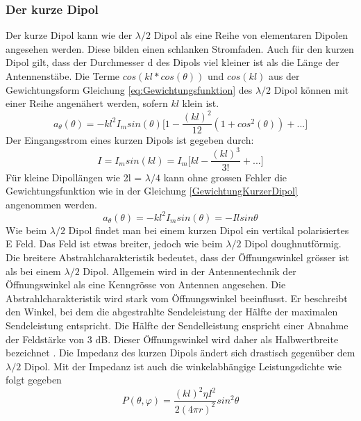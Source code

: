\newpage
\subsubsection{Der kurze Dipol }\label{sec:kurzerDipol}
Der kurze Dipol kann wie der $\lambda /2$ Dipol als eine Reihe von elementaren Dipolen angesehen werden. Diese bilden einen schlanken Stromfaden. Auch für den kurzen Dipol gilt, dass der Durchmesser d des Dipols viel kleiner ist als die Länge der Antennenstäbe. 
Die Terme $cos(kl*cos(\theta)) $ und $cos(kl)$ aus der Gewichtungsform Gleichung \ref{eq:Gewichtungsfunktion}
 des $\lambda/2$ Dipol können mit einer Reihe angenähert werden, sofern $kl$ klein ist.
\begin{equation}
a_{\theta}(\theta)=-kl^{2}I_{m}sin(\theta) \lbrack 1- \frac{(kl)^{2}}{12}(1+cos^{2}(\theta))+...\rbrack
\end{equation}
Der Eingangsstrom eines kurzen Dipols ist gegeben durch:
\begin{equation}
I=I_{m}sin(kl)=I_{m}\lbrack kl - \frac{(kl)^{3}}{3!} +... \rbrack
\end{equation}
 Für kleine Dipollängen wie 2l = $\lambda/4 $ kann ohne grossen Fehler die Gewichtungsfunktion wie in der Gleichung \ref{GewichtungKurzerDipol}  angenommen werden.
\begin{equation}\label{GewichtungKurzerDipol}
a_{\theta}(\theta)=-kl^{2}I_{m}sin(\theta)=-Ilsin\theta
\end{equation}
Wie beim $\lambda/2$ Dipol findet man bei einem kurzen Dipol ein vertikal polarisiertes E Feld. Das Feld ist etwas breiter, jedoch wie beim $\lambda/2$ Dipol doughnutförmig. Die breitere Abstrahlcharakteristik  bedeutet, dass der Öffnungswinkel grösser ist als bei einem $\lambda/2$ Dipol. Allgemein wird in der Antennentechnik  der Öffnungswinkel als eine Kenngrösse von Antennen angesehen. Die Abstrahlcharakteristik wird stark vom Öffnungswinkel beeinflusst. Er beschreibt  den Winkel, bei dem die abgestrahlte Sendeleistung der Hälfte der maximalen Sendeleistung entspricht. Die Hälfte der Sendelleistung enspricht   einer Abnahme der Feldstärke von 3 dB. Dieser Öffnungswinkel wird  daher als Halbwertbreite bezeichnet \cite{Oeffnungswinkel}.  Die Impedanz des kurzen Dipols ändert sich  drastisch gegenüber dem $\lambda/2$ Dipol. Mit der Impedanz ist auch die winkelabhängige Leistungsdichte wie folgt gegeben\cite{elliott1981antenna}
\begin{equation}
P(\theta,\varphi)=\frac{(kl)^{2}\eta I^{2}}{2(4\pi r)^{2}}sin^{2}\theta
\end{equation}
